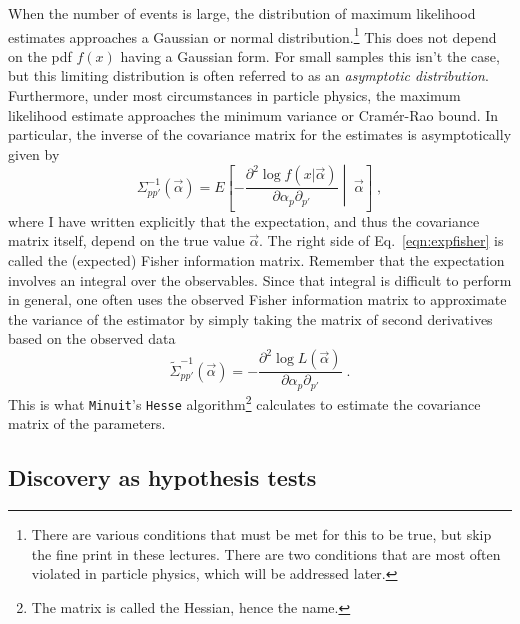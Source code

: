 When the number of events is large, the distribution of maximum likelihood estimates approaches a Gaussian or normal distribution.\footnote{There are various conditions that must be met for this to be true, but skip the fine print in these lectures.  There are two conditions that are most often violated in particle physics, which will be addressed later.}  This does not depend on the pdf $f(x)$ having a Gaussian form.  For small samples this isn't the case, but this limiting distribution is often referred to as an \textit{asymptotic distribution}.
Furthermore, under most circumstances in particle physics, the maximum likelihood estimate approaches the minimum variance or Cram\'er-Rao bound. In particular, the inverse of the covariance matrix for the estimates is asymptotically given by
\begin{equation}
\label{eqn:expfisher}
\Sigma_{pp'}^{-1}(\vec\alpha) = E\left[- \frac{\partial^2 \log f(x|\vec{\alpha})}{\partial\alpha_p \partial_{p'}}  \middle| \;\vec\alpha \right ]  \;,
\end{equation}
where I have written explicitly that the expectation, and thus the covariance matrix itself, depend on the true value $\vec\alpha$.  The right side of Eq.~\ref{eqn:expfisher} is called the (expected) Fisher information matrix. Remember that the expectation involves an integral over the observables.  Since that integral is difficult to perform in general, one often uses the observed Fisher information matrix to approximate the variance of the estimator by simply taking the matrix of second derivatives based on the observed data
\begin{equation}
\label{eqn:obsfisher}
\tilde\Sigma_{pp'}^{-1}(\vec\alpha) = - \frac{\partial^2 \log L(\vec{\alpha})}{\partial\alpha_p \partial_{p'}}  \; .
\end{equation}
This is what \texttt{Minuit}'s \texttt{Hesse} algorithm\footnote{The matrix is called the Hessian, hence the name.} calculates to estimate the covariance matrix of the parameters.


\subsection{Discovery as hypothesis tests}\label{S:hypothesis test}


